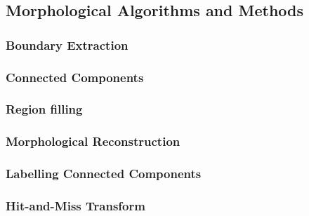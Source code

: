 \subsection{Morphological Algorithms and Methods} 
\label{booksection_84_Morphological_Algorithms_and_Methods}
\subsubsection{Boundary Extraction} 
\label{booksection_85_Boundary_Extraction}

\subsubsection{Connected Components} 
\label{booksection_86_Connected_Components}

\subsubsection{Region filling} 
\label{booksection_87_Region_filling}

\subsubsection{Morphological Reconstruction} 
\label{booksection_88_Morphological_Reconstruction}

\subsubsection{Labelling Connected Components} 
\label{booksection_89_Labelling_Connected_Components}

\subsubsection{Hit-and-Miss Transform} 
\label{booksection_90_Hit-and-Miss_Transform}

